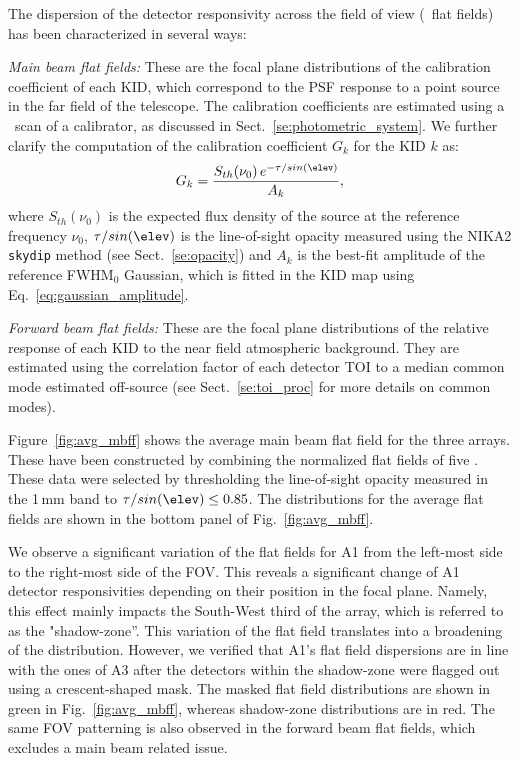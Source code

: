 The dispersion of the detector responsivity across the field of view (\aka\ flat
fields) has been characterized in several ways:

\noindent \emph{Main beam flat fields:} These are the focal plane distributions
of the calibration coefficient of each KID, which correspond to the
PSF response to a point source in the far field of the
telescope. The calibration coefficients are estimated using a \bm\ scan
of a calibrator, as discussed in Sect.~\ref{se:photometric_system}. We
further clarify the computation of the calibration coefficient $G_k$
for the KID $k$ as:
\begin{equation}
  G_k = \frac{S_{th}(\nu_0)\, e^{-\tau/sin(\elev)}}{A_k}, 
\end{equation}
where $S_{th}(\nu_0)$ is the expected flux density of the source at
the reference frequency $\nu_0$, $\tau/sin(\elev)$ is the
line-of-sight opacity measured using the NIKA2 {\tt skydip} method
(see Sect.~\ref{se:opacity}) and $A_k$ is the best-fit
amplitude of the reference FWHM$_0$ Gaussian, which is fitted in the
KID map using Eq.~\ref{eq:gaussian_amplitude}.

\noindent \emph{Forward beam flat fields:} These are the focal plane
distributions of the relative response of
each KID to the near field atmospheric background. They are estimated
using the correlation factor of each detector TOI 
to a median common mode estimated off-source (see Sect.~\ref{se:toi_proc} for
more details on common modes).

Figure~\ref{fig:avg_mbff} %
shows the average main beam %
flat field for the three arrays. These have been constructed by
combining the normalized flat fields of five \bms. These data were
selected by thresholding the line-of-sight opacity measured in the
1\,mm band to $\tau/sin(\elev) \leq 0.85$. The distributions for the average flat
fields are shown in the bottom panel of Fig.~\ref{fig:avg_mbff}.%

We observe a significant variation of the flat fields for A1 from the left-most side
to the right-most side of the FOV. This reveals a significant change of A1
detector responsivities depending on their position in the focal plane. Namely, this
effect mainly impacts the South-West third of the array, which is
referred to as the "shadow-zone''. This variation of the
flat field translates into a broadening of the distribution. However,
we verified that A1's flat field dispersions are in line with the ones of A3 after the
detectors within the shadow-zone were flagged out using a
crescent-shaped mask. The masked flat field distributions are shown in
green in Fig.~\ref{fig:avg_mbff}, %
whereas shadow-zone distributions are in red. The same FOV patterning
is also observed in the forward beam flat fields, which excludes a
main beam related issue. 


